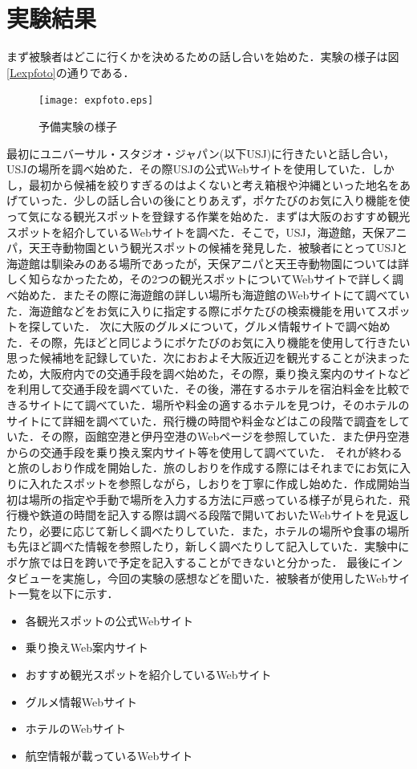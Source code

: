 \documentclass{funthesis}
\begin{document}
\section{実験結果}
まず被験者はどこに行くかを決めるための話し合いを始めた．実験の様子は図\ref{Lexpfoto}の通りである．

\begin{figure}[htpb]
\begin{center}
\texttt{[image: expfoto.eps]}
\end{center}
\caption{予備実験の様子}
\label{Lsepfoto}
\end{figure}


最初にユニバーサル・スタジオ・ジャパン(以下USJ)に行きたいと話し合い，USJの場所を調べ始めた．その際USJの公式Webサイトを使用していた．しかし，最初から候補を絞りすぎるのはよくないと考え箱根や沖縄といった地名をあげていった．少しの話し合いの後にとりあえず，ポケたびのお気に入り機能を使って気になる観光スポットを登録する作業を始めた．まずは大阪のおすすめ観光スポットを紹介しているWebサイトを調べた．そこで，USJ，海遊館，天保アニパ，天王寺動物園という観光スポットの候補を発見した．被験者にとってUSJと海遊館は馴染みのある場所であったが，天保アニパと天王寺動物園については詳しく知らなかったため，その2つの観光スポットについてWebサイトで詳しく調べ始めた．またその際に海遊館の詳しい場所も海遊館のWebサイトにて調べていた．海遊館などをお気に入りに指定する際にポケたびの検索機能を用いてスポットを探していた．
次に大阪のグルメについて，グルメ情報サイトで調べ始めた．その際，先ほどと同じようにポケたびのお気に入り機能を使用して行きたい思った候補地を記録していた．次におおよそ大阪近辺を観光することが決まったため，大阪府内での交通手段を調べ始めた，その際，乗り換え案内のサイトなどを利用して交通手段を調べていた．その後，滞在するホテルを宿泊料金を比較できるサイトにて調べていた．場所や料金の適するホテルを見つけ，そのホテルのサイトにて詳細を調べていた．飛行機の時間や料金などはこの段階で調査をしていた．その際，函館空港と伊丹空港のWebページを参照していた．また伊丹空港からの交通手段を乗り換え案内サイト等を使用して調べていた．
それが終わると旅のしおり作成を開始した．旅のしおりを作成する際にはそれまでにお気に入りに入れたスポットを参照しながら，しおりを丁寧に作成し始めた．作成開始当初は場所の指定や手動で場所を入力する方法に戸惑っている様子が見られた．飛行機や鉄道の時間を記入する際は調べる段階で開いておいたWebサイトを見返したり，必要に応じて新しく調べたりしていた．また，ホテルの場所や食事の場所も先ほど調べた情報を参照したり，新しく調べたりして記入していた．実験中にポケ旅では日を跨いで予定を記入することができないと分かった．
最後にインタビューを実施し，今回の実験の感想などを聞いた．被験者が使用したWebサイト一覧を以下に示す．
\begin{itemize}
 \item 各観光スポットの公式Webサイト
 \item 乗り換えWeb案内サイト
 \item おすすめ観光スポットを紹介しているWebサイト
 \item グルメ情報Webサイト
 \item ホテルのWebサイト
 \item 航空情報が載っているWebサイト
\end{itemize}
\end{document}
